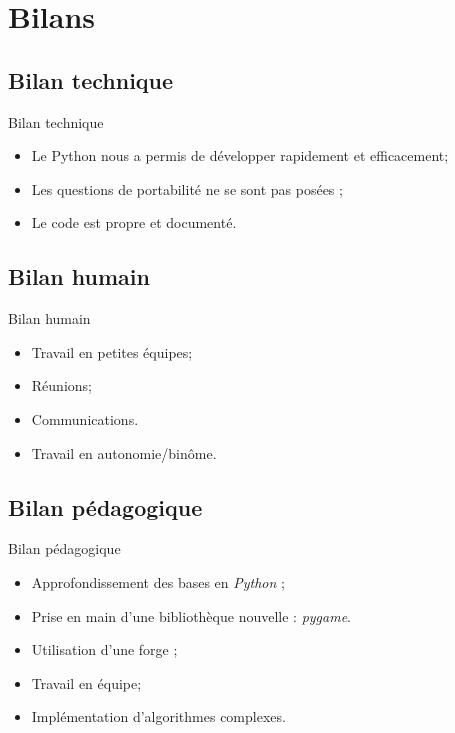 \documentclass[xcolor=dvipsnames]{beamer}
\begin{document}
\section{Bilans}
\subsection{Bilan technique}
	\begin{frame}{Bilan technique}
		\begin{itemize}
		\setlength{\itemsep}{0.3cm}
			\item Le Python nous a permis de développer rapidement et efficacement;
			\item Les questions de portabilité ne se sont pas posées ;
			\item Le code est propre et documenté.
		\end{itemize}
	\end{frame}
\subsection{Bilan humain}
	\begin{frame}{Bilan humain}
		\begin{itemize}
			\item Travail en petites équipes;
			\item Réunions;
			\item Communications.
			\vspace{1cm}
			\item Travail en autonomie/binôme.
		\end{itemize}
	\end{frame}
\subsection{Bilan pédagogique}
	\begin{frame}{Bilan pédagogique}
		\begin{itemize}
		\setlength{\itemsep}{0.3cm}
			\item Approfondissement des bases en \emph{Python} ;
			\item Prise en main d'une bibliothèque nouvelle :
				\emph{pygame}.
				
			\vspace{1cm}
			\item Utilisation d'une forge ;
			\item Travail en équipe;
            \item Implémentation d'algorithmes complexes.
		\end{itemize}
	\end{frame}
\end{document}
